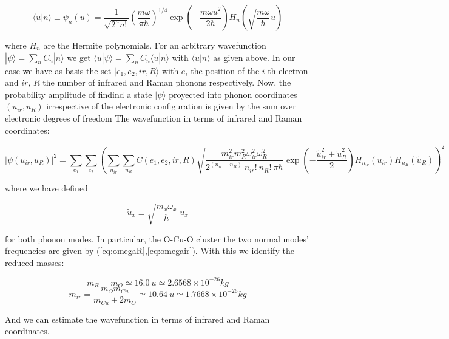 \begin{equation}\label{eq:harmOscProj}
\langle u | n \rangle \equiv \psi_n(u) = \frac{1}{\sqrt{2^n n!}} \left(\frac{m \omega}{\pi \hbar}\right)^{1/4}\exp\left(-\frac{m \omega u^2}{2 \hbar}\right) H_n\left( \sqrt{\frac{m \omega}{\hbar}} u \right) 
\end{equation}

where $H_n$ are the Hermite polynomials. For an arbitrary wavefunction $ | \psi \rangle = \sum_n C_n |n \rangle$ we get $ \langle u | \psi \rangle = \sum_n C_n \langle u | n \rangle$ with $\langle u | n \rangle$ as given above. In our case we have as basis the set ${| e_1, e_2, ir, R \rangle}$ with $e_i$ the position of the $i$-th electron and $ir$, $R$ the number of infrared and Raman phonons respectively. Now, the probability amplitude of findind a state $|\psi\rangle$ proyected into phonon coordinates $(u_{ir},u_R)$ irrespective of the electronic configuration is given by the sum over electronic degrees of freedom The wavefunction in terms of infrared and Raman coordinates:

\begin{equation}\label{eq:phonon-coord-projection}
|\psi(u_{ir}, u_R)|^2 = \sum_{e_1}\sum_{e_2} \left(\sum_{n_{ir}} \sum_{n_R} C(e_1, e_2, ir, R) \sqrt{\frac{ m_{ir}^2 m_R^2 \omega_{ir}^2 \omega_R^2 }{2^{(n_{ir} + n_R)}\ n_{ir}!\ n_R!\ \pi \hbar}} \exp \left( - \frac{ \tilde{u}_{ir}^2 + \tilde{u}_R^2 }{2}\right) H_{n_{ir}} ( \tilde{u}_{ir}) H_{n_R}( \tilde{u}_R) \right)^2
\end{equation}

where we have defined 

\begin{equation}\label{eq:uTildeDef}
\tilde{u}_x \equiv \sqrt{\frac{m_x\omega_x}{\hbar}}\ u_x
\end{equation}

for both phonon modes. In particular, the O-Cu-O cluster the two normal modes' frequencies are given by (\ref{eq:omegaR},\ref{eq:omegair}). With this we identify the reduced masses:

\begin{equation}\label{eq:redMassR}
m_R = m_O \simeq 16.0\ u \simeq 2.6568 \times 10^{-26} kg
\end{equation}
\begin{equation}\label{eq:redMassIr}
m_{ir}=\frac{m_Om_{Cu}}{m_{Cu}+2m_O} \simeq 10.64\ u \simeq 1.7668 \times 10^{-26}kg
\end{equation}

And we can estimate the wavefunction in terms of infrared and Raman coordinates.


